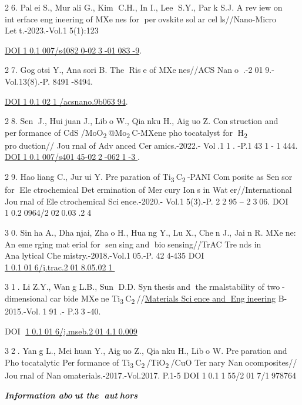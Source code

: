 {26. Palei S., Murali G., Kim C.H., In I., Lee S.Y., Park S.J. A
review on interface engineering of MXenes for perovskite solar
cells//Nano-Micro Lett.-2023.-Vol.15(1):123

\href{https://doi.org/10.1007/s40820-023-01083-9}{DOI
10.1007/s40820-023-01083-9}.

27. Gogotsi Y., Anasori B. The Rise of MXenes//ACS
Nano.-2019.-Vol.13(8).-P. 8491-8494.

\href{https://doi.org/10.1021/acsnano.9b06394}{DOI
10.1021/acsnano.9b06394}.

28. Sen J., Huijuan J., Libo W., Qianku H., Aiguo Z. Construction
and performance of
CdS/MoO\textsubscript{2}@Mo\textsubscript{2}C-MXene photocatalyst
for H\textsubscript{2} production// Journal of Advanced
Ceramics.-2022.- Vol.11. -P.1431- 1444.
\href{https://doi.org/10.1007/s40145-022-0621-3}{DOI
10.1007/s40145-022-0621-3}.

29. Haoliang C., Jurui Y. Preparation of
Ti\textsubscript{3}C\textsubscript{2}-PANI Composite as Sensor for
Electrochemical Determination of Mercury Ions in
Water//International Journal of Electrochemical Science.-2020.-
Vol.15(3).-P. 2295 -- 2306. DOI 10.20964/2020.03.24

30. Sinha A., Dhanjai, Zhao H., Huang Y., Lu X., Chen J., Jain R.
MXene: An emerging material for sensing and biosensing//TrAC
Trends in Analytical Chemistry.-2018.-Vol.105.-P. 424-435 DOI
\href{http://dx.doi.org/10.1016/j.trac.2018.05.021}{10.1016/j.trac.2018.05.021}

31. Li Z.Y., Wang L.B., Sun D.D. Synthesis and thermalstability
of two-dimensional carbide MXene
Ti\textsubscript{3}C\textsubscript{2}//\href{https://www.researchgate.net/journal/Materials-Science-and-Engineering-B-0921-5107?_tp=eyJjb250ZXh0Ijp7ImZpcnN0UGFnZSI6InB1YmxpY2F0aW9uIiwicGFnZSI6InB1YmxpY2F0aW9uIn19}{Materials
Science and Engineering} B- 2015.-Vol.191.- P.33-40.

DOI
\href{http://dx.doi.org/10.1016/j.mseb.2014.10.009}{10.1016/j.mseb.2014.10.009}

32. Yang L., Meihuan Y., Aiguo Z., Qianku H., Libo W.
Preparation and Photocatalytic Performance of
Ti\textsubscript{3}C\textsubscript{2}/TiO\textsubscript{2}/CuO
Ternary Nanocomposites// Journal of Nanomaterials.-2017.-Vol.2017.
P.1-5 DOI 10.1155/2017/1978764

\emph{{\bfseries Information about the authors}}

}
